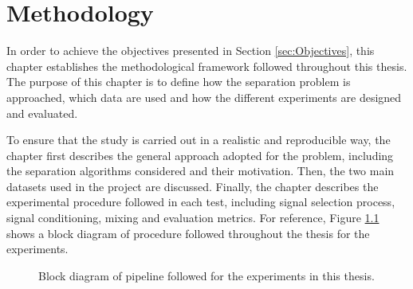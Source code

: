 \chapter{Methodology}

In order to achieve the objectives presented in Section \ref{sec:Objectives}, this chapter establishes the methodological framework followed throughout this thesis. The purpose of this chapter is to define how the separation problem is approached, which data are used and how the different experiments are designed and evaluated.

To ensure that the study is carried out in a realistic and reproducible way, the chapter first describes the general approach adopted for the problem, including the separation algorithms considered and their motivation. Then, the two main datasets used in the project are discussed.  Finally, the chapter describes the experimental procedure followed in each test, including signal selection process, signal conditioning, mixing and evaluation metrics. For reference, Figure \ref{fig:experimental_pipeline} shows a block diagram of procedure followed throughout the thesis for the experiments.
\\
\begin{figure}[H]
    \centering
    \caption{Block diagram of pipeline followed for the experiments in this thesis.}
    \label{fig:experimental_pipeline}
\end{figure}


